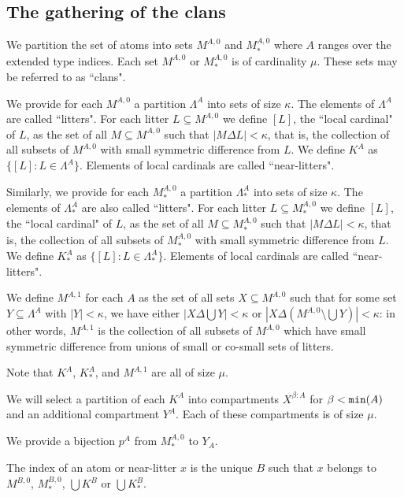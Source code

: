 \documentclass[12pt]{article}
\begin{document}
\subsection{The gathering of the clans}

We partition the set of atoms into sets $M^{A,0}$ and $M_*^{A,0}$ where $A$ ranges over the extended type indices.  Each set $M^{A,0}$ or $M_*^{A,0}$  is 
of cardinality $\mu$.  These sets may be referred to as ``clans".

We provide for each $M^{A,0}$ a partition $\Lambda^A$ into sets of size $\kappa$.  The elements of $\Lambda^A$ are called ``litters".  For each litter
$L \subseteq M^{A,0}$ we define $[L]$, the ``local cardinal" of $L$, as the set of all $M \subseteq M^{A,0}$ such that $|M \Delta L|<\kappa$, that is, the collection of all subsets
of $M^{A,0}$ with small symmetric difference from $L$.  We define $K^A$ as $\{[L]:L \in \Lambda^A\}$.  Elements of local cardinals are called ``near-litters".

Similarly, we provide for each $M^{A,0}_*$ a partition $\Lambda^A_*$ into sets of size $\kappa$.  The elements of $\Lambda^A_*$ are also  called ``litters".  For each litter
$L \subseteq M^{A,0}_*$ we define $[L]$, the ``local cardinal" of $L$, as the set of all $M \subseteq M^{A,0}_*$ such that $|M \Delta L|<\kappa$, that is, the collection of all subsets
of $M^{A,0}_*$ with small symmetric difference from $L$.  We define $K_*^A$ as $\{[L]:L \in \Lambda_*^A\}$.  Elements of local cardinals are called ``near-litters".

We define $M^{A,1}$ for each $A$ as the set of all sets $X \subseteq M^{A,0}$ such that for some set $Y \subseteq \Lambda^A$ with $|Y|<\kappa$, we have either
$|X \Delta \bigcup Y|<\kappa$ or \newline $|X \Delta (M^{A,0} \setminus \bigcup Y)|<\kappa$: in other words, $M^{A,1}$ is the collection of all subsets of $M^{A,0}$ which have small symmetric difference from unions of small or co-small sets of litters.

Note that $K^A$, $K^A_*$, and $M^{A,1}$ are all of size $\mu$.

We will select a partition of each $K^A$ into compartments $X^{\beta:A}$ for $\beta<{\tt min}(A)$ and an additional compartment $Y^A$.  Each of these compartments is of size $\mu$.  

We provide a bijection $p^A$ from $M_*^{A,0}$ to $Y_A$.

The index of
an atom or near-litter $x$  is the unique $B$ such that $x$  belongs to $M^{B,0}$, $M^{B,0}_*$, $\bigcup K^B$ or $\bigcup K^B_*$.
\end{document}
